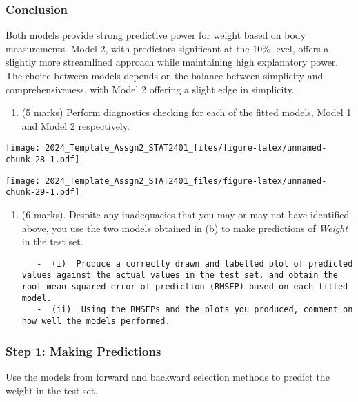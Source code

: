 \documentclass[
]{article}
\providecommand{\tightlist}{%
  \setlength{\itemsep}{0pt}\setlength{\parskip}{0pt}}
\begin{document}
\hypertarget{conclusion}{%
\subsubsection{Conclusion}\label{conclusion}}

Both models provide strong predictive power for weight based on body
measurements. Model 2, with predictors significant at the 10\% level,
offers a slightly more streamlined approach while maintaining high
explanatory power. The choice between models depends on the balance
between simplicity and comprehensiveness, with Model 2 offering a slight
edge in simplicity.

\begin{enumerate}
\def\labelenumi{(\alph{enumi})}
\setcounter{enumi}{2}
\tightlist
\item
  (5 marks) Perform diagnostics checking for each of the fitted models,
  Model 1 and Model 2 respectively.
\end{enumerate}

\texttt{[image: 2024\_Template\_Assgn2\_STAT2401\_files/figure-latex/unnamed-chunk-28-1.pdf]}

\texttt{[image: 2024\_Template\_Assgn2\_STAT2401\_files/figure-latex/unnamed-chunk-29-1.pdf]}

\begin{enumerate}
\def\labelenumi{(\alph{enumi})}
\setcounter{enumi}{3}
\item
  (6 marks). Despite any inadequacies that you may or may not have
  identified above, you use the two models obtained in (b) to make
  predictions of \emph{Weight} in the test set.

\begin{verbatim}
   -  (i)  Produce a correctly drawn and labelled plot of predicted values against the actual values in the test set, and obtain the root mean squared error of prediction (RMSEP) based on each fitted model. 
   -  (ii)  Using the RMSEPs and the plots you produced, comment on how well the models performed. 
\end{verbatim}
\end{enumerate}

\hypertarget{step-1-making-predictions}{%
\subsubsection{Step 1: Making
Predictions}\label{step-1-making-predictions}}

Use the models from forward and backward selection methods to predict
the weight in the test set.
\end{document}

